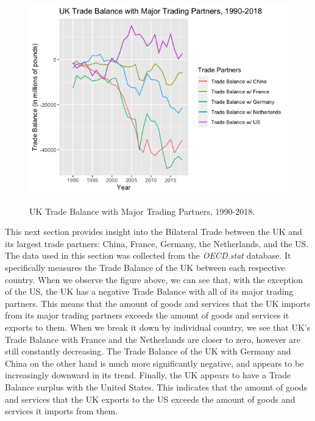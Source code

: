 \documentclass[12pt]{article}
\begin{document}
\begin{figure}[h!]
\begin{center}
\includegraphics[scale=0.75]{5.png}
\label{}
\caption{UK Trade Balance with Major Trading Partners, 1990-2018.}
\end{center}
\end{figure}

\begin{flushleft}
This next section provides insight into the Bilateral Trade between the UK and its largest trade partners: China, France, Germany, the Netherlands, and the US. The data used in this section was collected from the \textit{OECD.stat} database. It specifically measures the Trade Balance of the UK between each respective country.
\break
\linebreak
When we observe the figure above, we can see that, with the exception of the US, the UK has a negative Trade Balance with all of its major trading partners. This means that the amount of goods and services that the UK imports from its major trading partners exceeds the amount of goods and services it exports to them.
\break
\linebreak
When we break it down by individual country, we see that UK's Trade Balance with France and the Netherlands are closer to zero, however are still constantly decreasing. The Trade Balance of the UK with Germany and China on the other hand is much more significantly negative, and appears to be increasingly downward in its trend.
\break
\linebreak
Finally, the UK appears to have a Trade Balance surplus with the United States. This indicates that the amount of goods and services that the UK exports to the US exceeds the amount of goods and services it imports from them.
\end{flushleft}
\end{document}
